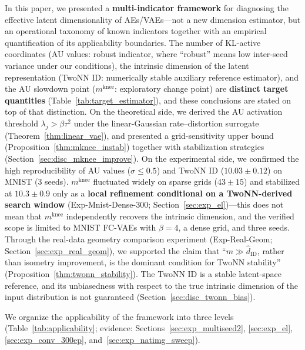 \documentclass[make,article,submit,pdftex,moreauthors]{Definitions/mdpi}
\newcommand{\mknee}{m^{\mathrm{knee}}}
\begin{document}
In this paper, we presented a \textbf{multi-indicator framework} for diagnosing
the effective latent dimensionality of AEs/VAEs---not a new dimension
estimator, but an operational taxonomy of known indicators together with an
empirical quantification of its applicability boundaries.
The number of KL-active coordinates (AU values: robust indicator, where
``robust'' means low inter-seed variance under our conditions), the intrinsic
dimension of the latent representation (TwoNN ID: numerically stable auxiliary
reference estimator), and the AU slowdown point ($\mknee$: exploratory change
point) are \textbf{distinct target quantities}
(Table~\ref{tab:target_estimator}), and these conclusions are stated on top of
that distinction.
On the theoretical side, we derived the AU activation threshold
$\lambda_j > \beta\tau^2$ under the linear-Gaussian rate--distortion surrogate
(Theorem~\ref{thm:linear_vae}), and presented a grid-sensitivity upper bound
(Proposition~\ref{thm:mknee_instab}) together with stabilization strategies
(Section~\ref{sec:disc_mknee_improve}).
On the experimental side, we confirmed the high reproducibility of AU values
($\sigma \leq 0.5$) and TwoNN ID ($10.03 \pm 0.12$) on MNIST (3 seeds).
$\mknee$ fluctuated widely on sparse grids ($43 \pm 15$) and stabilized at
$10.3 \pm 0.9$ only as a \textbf{local refinement conditional on a
TwoNN-derived search window} (Exp-Mnist-Dense-300;
Section~\ref{sec:exp_el})---this does not mean that $\mknee$ independently
recovers the intrinsic dimension, and the verified scope is limited to MNIST
FC-VAEs with $\beta = 4$, a dense grid, and three seeds.
Through the real-data geometry comparison experiment
(Exp-Real-Geom; Section~\ref{sec:exp_real_geom}), we supported the claim that
``$m \gg \hat{d}_\mathrm{ID}$, rather than isometry improvement, is the
dominant condition for TwoNN stability''
(Proposition~\ref{thm:twonn_stability}).
The TwoNN ID is a stable latent-space reference, and its unbiasedness with
respect to the true intrinsic dimension of the input distribution is not
guaranteed (Section~\ref{sec:disc_twonn_bias}).

We organize the applicability of the framework into three levels
(Table~\ref{tab:applicability};
evidence: Sections~\ref{sec:exp_multiseed2}, \ref{sec:exp_el},
\ref{sec:exp_conv_300ep}, and~\ref{sec:exp_natimg_sweep}).
\end{document}
